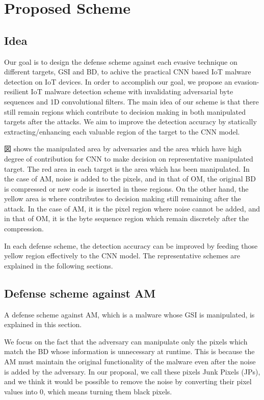 \chapter{Proposed Scheme}\label{sec:proposed_scheme}

\section{Idea}
Our goal is to design the defense scheme against each evasive technique on different targets, GSI and BD, to achive the practical CNN based IoT malware detection on IoT devices.
In order to accomplish our goal, we propose an evasion-resilient IoT malware detection scheme with invalidating adversarial byte sequences and 1D convolutional filters.  
The main idea of our scheme is that there still remain regions which contribute to decision making in both manipulated targets after the attacks.
We aim to improve the detection accuracy by statically extracting/enhancing each valuable region of the target to the CNN model.

図 shows the manipulated area by adversaries and the area which have high degree of contribution for CNN to make decision on representative manipulated target.
The red area in each target is the area which has been manipulated.
In the case of AM, noise is added to the pixels, and in that of OM, the original BD is compressed or new code is inserted in these regions.
On the other hand, the yellow area is where contributes to decision making still remaining after the attack.
In the case of AM, it is the pixel region where noise cannot be added, and in that of OM, it is the byte sequence region which remain discretely after the compression.

In each defense scheme, the detection accuracy can be improved by feeding those yellow region effectively to the CNN model.
The representative schemes are explained in the following sections.

\section{Defense scheme against AM}
A defense scheme against AM, which is a malware whose GSI is manipulated, is explained in this section.

We focus on the fact that the adversary can manipulate only the pixels which match the BD whose information is unnecessary at runtime.
This is because the AM must maintain the original functionality of the malware even after the noise is added by the adversary.
In our proposal, we call these pixels Junk Pixels (JPs), and we think it would be possible to remove the noise by converting their pixel values into 0, which means turning them black pixels.

